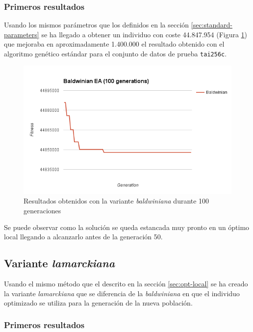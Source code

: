 \subsubsection{Primeros resultados}

Usando los mismos parámetros que los definidos en la sección \ref{sec:standard-parameters} se ha llegado a obtener un individuo con coste 44.847.954 (Figura \ref{fig:baldwinian-ea}) que mejoraba en aproximadamente 1.400.000 el resultado obtenido con el algoritmo genético estándar para el conjunto de datos de prueba \texttt{tai256c}. 

\begin{figure}[H]
	\centering
	\includegraphics[width=14cm]{img/baldwinian-ea}
	\caption{Resultados obtenidos con la variante \textit{baldwiniana} durante 100 generaciones}
	\label{fig:baldwinian-ea}
\end{figure}

Se puede observar como la solución se queda estancada muy pronto en un óptimo local llegando a alcanzarlo antes de la generación 50.

\subsection{Variante \textit{lamarckiana}}

Usando el mismo método que el descrito en la sección \ref{sec:opt-local} se ha creado la variante \textit{lamarckiana} que se diferencia de la \textit{baldwiniana} en que el individuo optimizado se utiliza para la generación de la nueva población.

\subsubsection{Primeros resultados}


